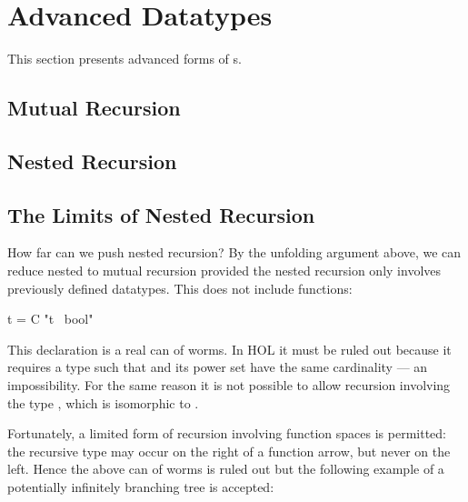 


\section{Advanced Datatypes}
\label{sec:advanced-datatypes}

This section presents advanced forms of s.

\subsection{Mutual Recursion}
\label{sec:datatype-mut-rec}



\subsection{Nested Recursion}
\label{sec:nested-datatype}

{\makeatother}


\subsection{The Limits of Nested Recursion}

How far can we push nested recursion? By the unfolding argument above, we can
reduce nested to mutual recursion provided the nested recursion only involves
previously defined datatypes. This does not include functions:
\begin{isabelle}
 t = C "t \isasymRightarrow\ bool"
\end{isabelle}
This declaration is a real can of worms.
In HOL it must be ruled out because it requires a type
 such that  and its power set  have the
same cardinality --- an impossibility. For the same reason it is not possible
to allow recursion involving the type , which is isomorphic to
.

Fortunately, a limited form of recursion
involving function spaces is permitted: the recursive type may occur on the
right of a function arrow, but never on the left. Hence the above can of worms
is ruled out but the following example of a potentially infinitely branching tree is
accepted:
\smallskip


\bigskip

